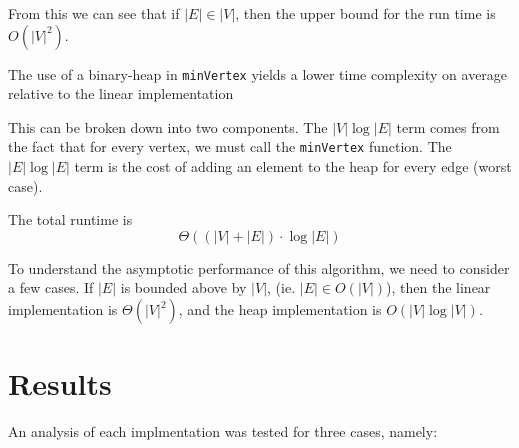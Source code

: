 \documentclass[technote]{IEEEtran}
\begin{document}
From this we can see that if $|E| \in |V|$, 
then the upper bound for the run time is $O(|V|^2)$.


The use of a binary-heap in \texttt{minVertex} yields a 
lower time complexity on average relative to the linear implementation




This can be broken down into two components. 
The $|V|\log|E|$ term comes from the fact that for every vertex, 
we must call the \texttt{minVertex} function.
The $|E|\log|E|$ term is the cost of adding an element to the 
heap for every edge (worst case).

The total runtime is 
$$\Theta ( (|V| + |E|) \cdot \log|E| )$$


To understand the asymptotic performance of this algorithm, 
we need to consider a few cases.
If $|E|$ is bounded above by $|V|$, (ie. $|E| \in O(|V|)$), 
then the linear implementation is $\Theta(|V|^2)$, 
and the heap implementation is $O(|V| \log |V|)$.



\section{Results}

An analysis of each implmentation was tested for 
three cases, namely: 

\end{document}
